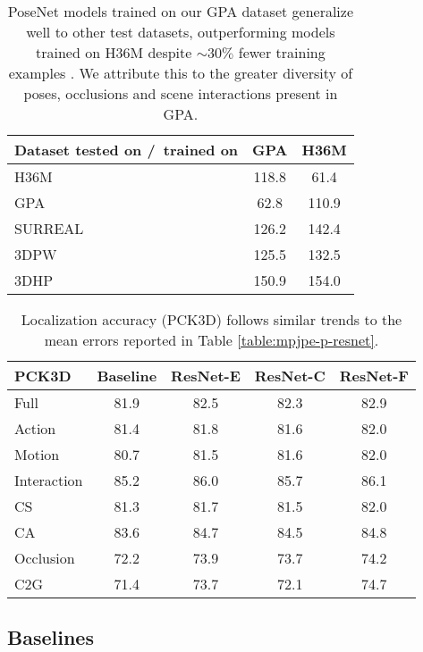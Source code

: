 \documentclass[times,referee,twocolumn,final,authoryear]{elsarticle}
\begin{document}
\begin{table}[t]
\begin{center}
\small
\begin{tabular}{l|c|c}
\hline
Dataset tested on /\ trained on  & GPA & H36M\\
\hline
H36M \cite{h36m_pami} & 118.8 & 61.4\\
GPA   & 62.8  & 110.9 \\
SURREAL \cite{varol17_surreal} & 126.2 & 142.4\\
3DPW \cite{inthewildeccv2018} & 125.5 & 132.5 \\
3DHP \cite{mono_3dhp2017} & 150.9 & 154.0\\
\hline
\end{tabular}
\end{center}
\caption{PoseNet models trained on our GPA dataset generalize well to other test datasets, outperforming models trained on H36M despite $\sim30\%$ fewer training examples \citep{crossdatasetevaluation}. We attribute this to the greater diversity of poses, occlusions and scene interactions present in GPA.}
\label{table:otherdataset}
\end{table}

\begin{table}[t]
\begin{center}
\small
\begin{tabular}{l|c|c|c|c}
\hline
PCK3D & Baseline & ResNet-E & ResNet-C & ResNet-F \\
\hline
Full & 81.9 & 82.5 &  82.3 & 82.9 \\
\hline\hline
Action & 81.4 & 81.8 & 81.6 & 82.0 \\
Motion & 80.7 & 81.5 & 81.6 & 82.0 \\
Interaction & 85.2 & 86.0 & 85.7 & 86.1 \\
\hline
\hline
CS & 81.3 & 81.7 & 81.5 & 82.0 \\
CA & 83.6 & 84.7 & 84.5 & 84.8 \\
\hline
\hline
Occlusion & 72.2 & 73.9 & 73.7 & 74.2 \\
C2G & 71.4 & 73.7 & 72.1 & 74.7  \\
\hline
\end{tabular}
\end{center}
\caption{Localization accuracy (PCK3D) follows similar trends to the mean errors 
reported in Table \ref{table:mpjpe-p-resnet}.}
\label{table:pck3d-p-resnet}
\end{table}

\subsection{Baselines}
\end{document}
